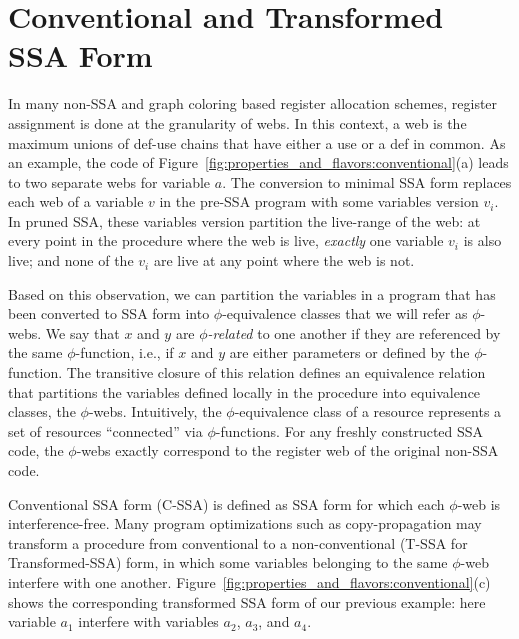 \section{Conventional and Transformed SSA Form}
\label{sec-prop-conventional}

In many non-SSA and graph coloring based register allocation schemes, register assignment is done at the granularity of webs. In this context, a web is the maximum unions of def-use chains that have either a use or a def in common. As an example, the code of Figure~\ref{fig:properties_and_flavors:conventional}(a) leads to two separate webs for variable $a$.
The conversion to minimal SSA form replaces each web of a variable $v$ in the pre-SSA
program with some variables version $v_i$. In pruned
SSA, these variables version partition the live-range of the web: at every point in the procedure where the web is
live, \emph{exactly} one variable $v_{i}$ is also live; and none of
the $v_{i}$ are live at any point where the web is not. 


Based on this observation, we can partition the variables in a 
program that has been converted to SSA form into $\phi$-equivalence classes that we will refer as $\phi$-webs. 
We say that $x$ and $y$ are \emph{$\phi$-related} to one another
if they are referenced by the same $\phi$-function, i.e., 
if $x$ and $y$ are either parameters or defined by the $\phi$-function. The transitive closure of this relation defines an equivalence relation that 
partitions the variables defined locally in the procedure into equivalence classes, the $\phi$-webs.
Intuitively, the $\phi$-equivalence class of a resource represents a set of resources ``connected'' via $\phi$-functions.
For any freshly constructed SSA code, the $\phi$-webs exactly correspond to the register web of the original non-SSA code.

Conventional SSA form (C-SSA) is defined as SSA form for which each $\phi$-web
is interference-free. Many program optimizations such as copy-propagation may transform a procedure from conventional
to a non-conventional (T-SSA for Transformed-SSA) form, in which some variables belonging to
the same $\phi$-web interfere with one another. Figure~\ref{fig:properties_and_flavors:conventional}(c)
shows the corresponding transformed SSA form of our previous example: here variable $a_1$ interfere with variables $a_2$, $a_3$, and $a_4$.


